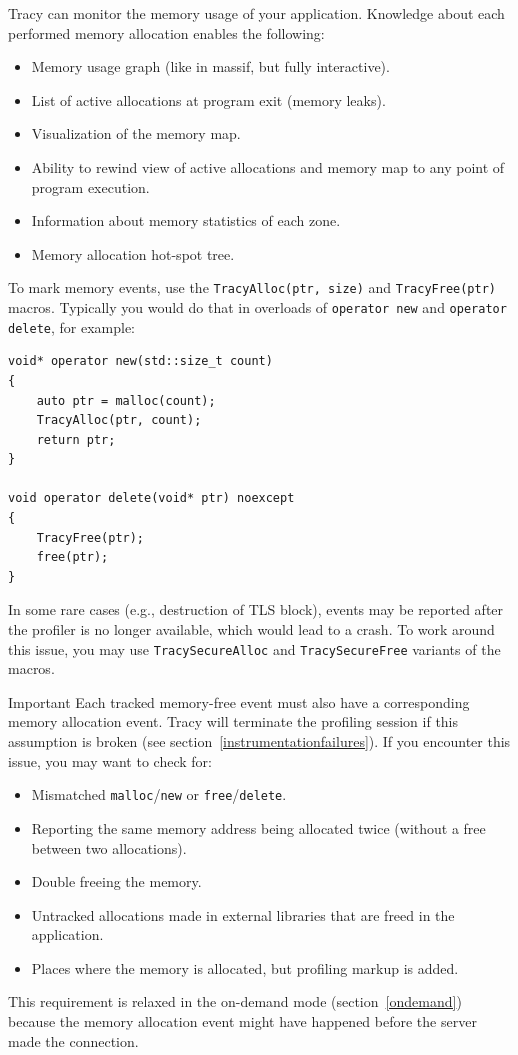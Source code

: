 \documentclass[hidelinks,titlepage,a4paper]{article}
\begin{document}
Tracy can monitor the memory usage of your application. Knowledge about each performed memory allocation enables the following:

\begin{itemize}
\item Memory usage graph (like in massif, but fully interactive).
\item List of active allocations at program exit (memory leaks).
\item Visualization of the memory map.
\item Ability to rewind view of active allocations and memory map to any point of program execution.
\item Information about memory statistics of each zone.
\item Memory allocation hot-spot tree.
\end{itemize}

To mark memory events, use the \texttt{TracyAlloc(ptr, size)} and \texttt{TracyFree(ptr)} macros. Typically you would do that in overloads of \texttt{operator new} and \texttt{operator delete}, for example:

\begin{lstlisting}
void* operator new(std::size_t count)
{
    auto ptr = malloc(count);
    TracyAlloc(ptr, count);
    return ptr;
}

void operator delete(void* ptr) noexcept
{
    TracyFree(ptr);
    free(ptr);
}
\end{lstlisting}

In some rare cases (e.g., destruction of TLS block), events may be reported after the profiler is no longer available, which would lead to a crash. To work around this issue, you may use \texttt{TracySecureAlloc} and \texttt{TracySecureFree} variants of the macros.

\begin{bclogo}[
noborder=true,
couleur=black!5,
logo=\bcbombe
]{Important}
Each tracked memory-free event must also have a corresponding memory allocation event. Tracy will terminate the profiling session if this assumption is broken (see section~\ref{instrumentationfailures}). If you encounter this issue, you may want to check for:

\begin{itemize}
\item Mismatched \texttt{malloc}/\texttt{new} or \texttt{free}/\texttt{delete}.
\item Reporting the same memory address being allocated twice (without a free between two allocations).
\item Double freeing the memory.
\item Untracked allocations made in external libraries that are freed in the application.
\item Places where the memory is allocated, but profiling markup is added.
\end{itemize}

This requirement is relaxed in the on-demand mode (section~\ref{ondemand}) because the memory allocation event might have happened before the server made the connection.
\end{bclogo}
\end{document}
